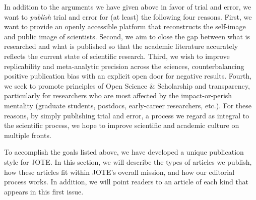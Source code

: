 \documentclass[twocolumn, serif]{jote-article}
\begin{document}
{{{{{In addition to the arguments we have given above in favor of trial and error, we want to \emph{publish} trial and error for (at least) the following four reasons. First, we want to provide an openly accessible platform that reconstructs the self-image and public image of scientists. Second, we aim to close the gap between what is researched and what is published so that the academic literature accurately reflects the current state of scientific research. Third, we wish to improve replicability and meta-analytic precision across the sciences, counterbalancing positive publication bias with an explicit open door for negative results. Fourth, we seek to promote principles of Open Science \& Scholarship and transparency, particularly for researchers who are most affected by the impact-or-perish mentality (graduate students, postdocs, early-career researchers, etc.). For these reasons, by simply publishing trial and error, a process we regard as integral to the scientific process, we hope to improve scientific and academic culture on multiple fronts.

\hypertarget{how-do-we-publish}{%

To accomplish the goals listed above, we have developed a unique publication style for JOTE. In this section, we will describe the types of articles we publish, how these articles fit within JOTE's overall mission, and how our editorial process works. In addition, we will point readers to an article of each kind that appears in this first issue.

\hypertarget{empirical-articles}{%

}}}}}}}
\end{document}
